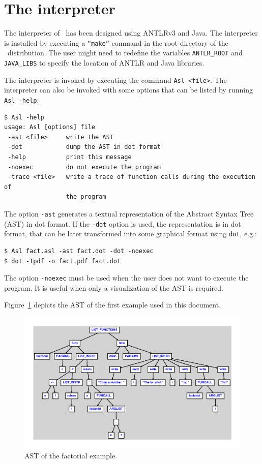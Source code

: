 \section{The interpreter}

The interpreter of \asl\ has been designed using ANTLRv3 and Java.
The interpreter is installed by executing a \texttt{``make''} command
in the root directory of the \asl\ distribution. The user might need to
redefine the variables \texttt{ANTLR\_ROOT} and \texttt{JAVA\_LIBS}
to specify the location of ANTLR and Java libraries.

The interpreter is invoked by executing the command \texttt{Asl <file>}.
The interpreter can also be invoked with some options that can be
listed by running \texttt{Asl -help}:

\begin{verbatim}
$ Asl -help
usage: Asl [options] file
 -ast <file>     write the AST
 -dot            dump the AST in dot format
 -help           print this message
 -noexec         do not execute the program
 -trace <file>   write a trace of function calls during the execution of
                 the program
\end{verbatim}

The option \texttt{-ast} generates a textual representation of the Abstract
Syntax Tree (AST) in dot format. If the \texttt{-dot} option is used, the
representation is in dot format, that can be later transformed into
some graphical format using \texttt{dot}, e.g.:

\begin{verbatim}
$ Asl fact.asl -ast fact.dot -dot -noexec
$ dot -Tpdf -o fact.pdf fact.dot
\end{verbatim}

The option \texttt{-noexec} must be used when the user does not want
to execute the program. It is useful when only a visualization of the AST is
required.

Figure~\ref{fig:ast} depicts the AST of the first example used in this
document.

\begin{figure}
 \centering
 \includegraphics[width=\linewidth]{./fact.pdf}
 \caption{AST of the factorial example.}
 \label{fig:ast}
\end{figure}

